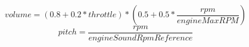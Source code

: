 \documentclass{article}
\begin{document}
$$ volume = (0.8 + 0.2 * throttle) * (0.5 + 0.5 * \frac{rpm}{engineMaxRPM}) $$ 
$$ pitch = \frac{rpm}{engineSoundRpmReference} $$
\end{document}
